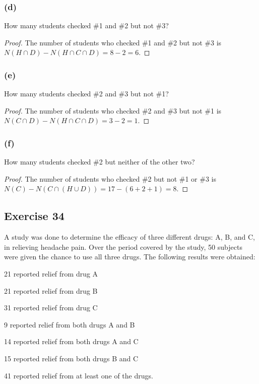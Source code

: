 \documentclass[14pt]{extarticle}
\begin{document}
\subsubsection{(d)}
How many students checked \#1 and \#2 but not \#3?

\begin{proof}
     The number of students who checked \#1 and \#2 but not \#3 is \(N(H \cap D) - N(H \cap C \cap D) = 8 - 2 = 6\).
\end{proof}

\subsubsection{(e)}
How many students checked \#2 and \#3 but not \#1?

\begin{proof}
     The number of students who checked \#2 and \#3 but not \#1 is \(N(C \cap D) - N(H \cap C \cap D) = 3 - 2 = 1\).
\end{proof}

\subsubsection{(f)}
How many students checked \#2 but neither of the other two?

\begin{proof}
     The number of students who checked \#2 but not \#1 or \#3 is \(N(C) - N(C \cap (H \cup D)) = 17 - (6+2+1) = 8\).
\end{proof}

\subsection{Exercise 34}
A study was done to determine the efficacy of three different drugs: A, B, and C, in relieving headache pain.
Over the period covered by the study, 50 subjects were given the chance to use all three drugs. The following
results were obtained:

21 reported relief from drug A

21 reported relief from drug B

31 reported relief from drug C

9 reported relief from both drugs A and B

14 reported relief from both drugs A and C

15 reported relief from both drugs B and C

41 reported relief from at least one of the drugs.
\end{document}
